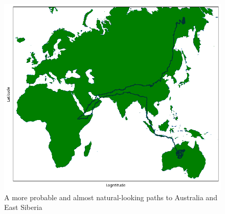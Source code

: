 \documentclass[11pt]{article}
\begin{document}
\begin{figure}[h!]
    \centering
    \includegraphics[scale=0.4]{Files/Images/final.png}
    \caption{A more probable and almost natural-looking paths to Australia and East Siberia}
    \label{fig:my_label}
\end{figure}
\end{document}

